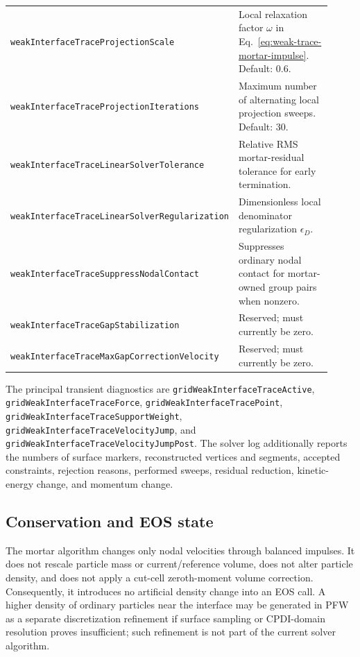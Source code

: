 \begin{longtable}{>{\raggedright\arraybackslash}p{0.40\linewidth}>{\raggedright\arraybackslash}p{0.52\linewidth}}
\texttt{weakInterfaceTraceProjectionScale} & Local relaxation factor $\omega$ in Eq.~\eqref{eq:weak-trace-mortar-impulse}.  Default: 0.6. \\
\texttt{weakInterfaceTraceProjectionIterations} & Maximum number of alternating local projection sweeps.  Default: 30. \\
\texttt{weakInterfaceTraceLinearSolverTolerance} & Relative RMS mortar-residual tolerance for early termination. \\
\texttt{weakInterfaceTraceLinearSolverRegularization} & Dimensionless local denominator regularization $\epsilon_D$. \\
\texttt{weakInterfaceTraceSuppressNodalContact} & Suppresses ordinary nodal contact for mortar-owned group pairs when nonzero. \\
\texttt{weakInterfaceTraceGapStabilization} & Reserved; must currently be zero. \\
\texttt{weakInterfaceTraceMaxGapCorrectionVelocity} & Reserved; must currently be zero. \\
\bottomrule
\end{longtable}
\endgroup

The principal transient diagnostics are
\texttt{gridWeakInterfaceTraceActive},
\texttt{gridWeakInterfaceTraceForce},
\texttt{gridWeakInterfaceTracePoint},
\texttt{gridWeakInterfaceTraceSupportWeight},
\texttt{gridWeakInterfaceTraceVelocityJump}, and
\texttt{gridWeakInterfaceTraceVelocityJumpPost}.  The solver log additionally
reports the numbers of surface markers, reconstructed vertices and segments,
accepted constraints, rejection reasons, performed sweeps, residual reduction,
kinetic-energy change, and momentum change.

\subsection{Conservation and EOS state}

The mortar algorithm changes only nodal velocities through balanced impulses.
It does not rescale particle mass or current/reference volume, does not alter
particle density, and does not apply a cut-cell zeroth-moment volume correction.
Consequently, it introduces no artificial density change into an EOS call.  A
higher density of ordinary particles near the interface may be generated in PFW
as a separate discretization refinement if surface sampling or CPDI-domain
resolution proves insufficient; such refinement is not part of the current
solver algorithm.

